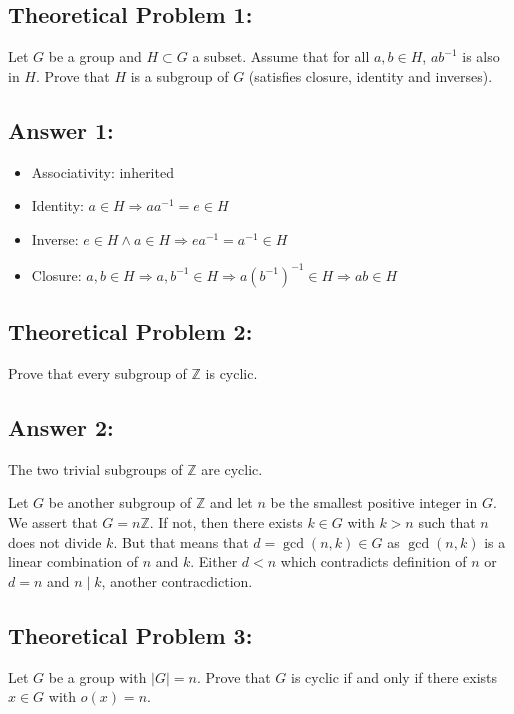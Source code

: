 \documentclass[%
  10pt,
  letterpaper
]{article}
\begin{document}
\newpage
\subsection*{Theoretical Problem 1: }
 Let $G$ be a group and $H \subset G$ a subset. Assume that for all $a, b \in H$, $a b^{-1}$ is also in $H$. 
    Prove that $H$ is a subgroup of $G$ (satisfies closure, identity and inverses).
\subsection*{Answer 1:}
\begin{itemize}
\item[] Associativity: inherited
\item[] Identity: $a\in H \Rightarrow aa^{-1} = e \in H$
\item[] Inverse: $e\in H \land a \in H \Rightarrow ea^{-1} = a^{-1} \in H$
\item[] Closure: $a,b \in H \Rightarrow a, b^{-1} \in H \Rightarrow a(b^{-1})^{-1} \in H \Rightarrow ab\in H$
\end{itemize}
\newpage
\subsection*{Theoretical Problem 2: }
Prove that every subgroup of $\mathbb{Z}$ is cyclic.

\subsection*{Answer 2:}
The two trivial subgroups of $\mathbb{Z}$ are cyclic.

Let $G$ be another subgroup of $\mathbb{Z}$
and let $n$ be the smallest positive integer in $G$. We assert that $G = n\mathbb{Z}$. If not,
then there exists $k\in G$ with $k>n$ such that $n$ does not divide $k$. But that means that
$d=\gcd(n,k) \in G$ as $\gcd(n,k)$ is a linear combination of $n$ and $k$. Either $d<n$ which
contradicts definition of $n$ or $d = n$ and $n\mid k$, another contracdiction.
\newpage
\subsection*{Theoretical Problem 3: }
Let $G$ be a group with $|G| = n$. Prove that $G$ is cyclic if and only if there exists
$x \in G$ with $o(x) = n$.
\end{document}
